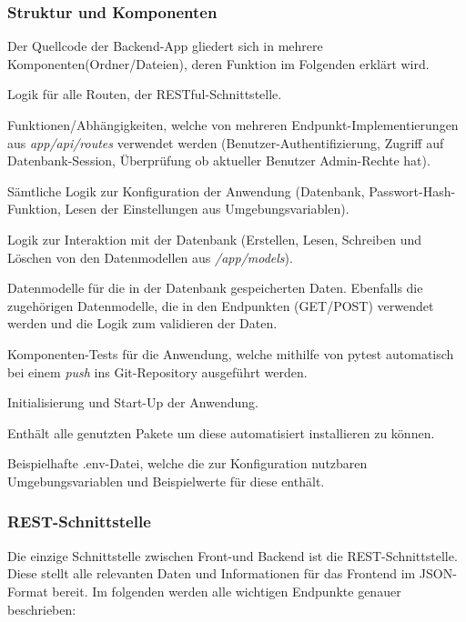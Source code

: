 \documentclass[conference,a4paper]{cs-techrep}
\begin{document}
\subsubsection{Struktur und Komponenten}
Der Quellcode der Backend-App gliedert sich in mehrere Komponenten(Ordner/Dateien), deren Funktion im Folgenden erklärt wird.
\begin{description}[style=standard]
	\item[app/api/routes] Logik für alle Routen, der RESTful-Schnittstelle.
	\item[app/api/dependencies.py] Funktionen/Abhängigkeiten, welche von mehreren Endpunkt-Implementierungen aus \emph{app/api/routes} verwendet werden (Benutzer-Authentifizierung, Zugriff auf Datenbank-Session, Überprüfung ob aktueller Benutzer Admin-Rechte hat).
	\item[app/core] Sämtliche Logik zur Konfiguration der Anwendung (Datenbank, Passwort-Hash-Funktion, Lesen der Einstellungen aus Umgebungsvariablen).
	\item[app/crud] Logik zur Interaktion mit der Datenbank (Erstellen, Lesen, Schreiben und Löschen von den Datenmodellen aus \emph{/app/models}).
	\item[app/models] Datenmodelle für die in der Datenbank gespeicherten Daten. Ebenfalls die zugehörigen Datenmodelle, die in den Endpunkten (GET/POST) verwendet werden und die Logik zum validieren der Daten.
	\item[app/tests] Komponenten-Tests für die Anwendung, welche mithilfe von pytest \cite{pytest} automatisch bei einem \emph{push} ins Git-Repository ausgeführt werden.
	\item[main.py] Initialisierung und Start-Up der Anwendung.
	\item[requirements.txt] Enthält alle genutzten Pakete um diese automatisiert installieren zu können.
	\item[.env.example] Beispielhafte .env-Datei, welche die zur Konfiguration nutzbaren Umgebungsvariablen und Beispielwerte für diese enthält.
\end{description}

\subsubsection{REST-Schnittstelle}
Die einzige Schnittstelle zwischen Front-und Backend ist die REST-Schnittstelle. Diese stellt alle relevanten Daten und Informationen für das Frontend im JSON-Format bereit. Im folgenden werden alle wichtigen Endpunkte genauer beschrieben:
\end{document}
